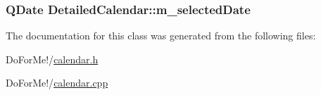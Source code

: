 \hypertarget{class_detailed_calendar_ac9550d3e565e00d53f8861d44e671faf}{
\subsubsection[{m\-\_\-selected\-Date}]{\setlength{\rightskip}{0pt plus 5cm}Q\-Date Detailed\-Calendar\-::m\-\_\-selected\-Date\hspace{0.3cm}{\ttfamily [private]}}}\label{class_detailed_calendar_ac9550d3e565e00d53f8861d44e671faf}


The documentation for this class was generated from the following files\-:\begin{DoxyCompactItemize}
\item 
Do\-For\-Me!/\hyperlink{calendar_8h}{calendar.\-h}\item 
Do\-For\-Me!/\hyperlink{calendar_8cpp}{calendar.\-cpp}\end{DoxyCompactItemize}
